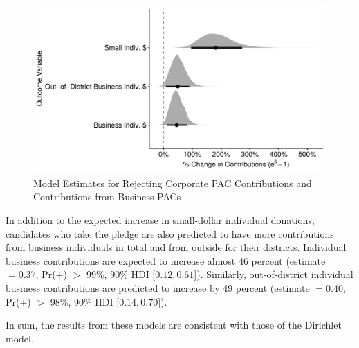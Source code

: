\documentclass[12pt]{article}
\begin{document}
\begin{appendices}
\begin{figure}[!htb]
	\centering
	\includegraphics[width=0.9\linewidth]{indv_gamma_coef.pdf}  
	\caption{Model Estimates for Rejecting Corporate PAC Contributions and Contributions from Business PACs}
	\label{fig: indiv results}
\end{figure}

In addition to the expected increase in small-dollar individual donations, candidates who take the pledge are also predicted to have more contributions from business individuals in total and from outside for their districts. Individual business contributions are expected to increase almost 46 percent (estimate $= 0.37$, Pr(+) $>$ 99\%, 90\% HDI [$0.12, 0.61$]). Similarly, out-of-district individual business contributions are predicted to increase by 49 percent (estimate $= 0.40$, Pr(+) $>$ 98\%, 90\% HDI [$0.14,  0.70]$).  

In sum, the results from these models are consistent with those of the Dirichlet model.

\end{appendices}
\end{document}
